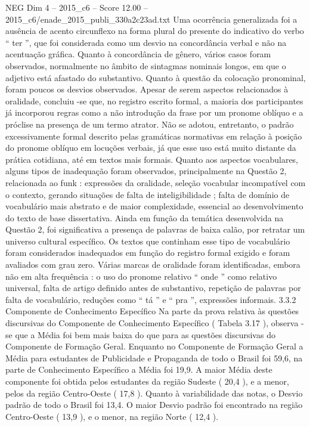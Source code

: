 \begin{textsample}{NEG Dim 4 – 2015\_c6 – Score 12.00 – 2015\_c6/enade\_2015\_publi\_330a2c23ad.txt}
Uma ocorrência generalizada foi a ausência de acento circunflexo na forma plural do presente do indicativo do verbo “ ter ”, que foi considerada como um desvio na concordância verbal e não na acentuação gráfica.
Quanto à concordância de gênero, vários casos foram observados, normalmente no âmbito de sintagmas nominais longos, em que o adjetivo está afastado do substantivo.
Quanto à questão da colocação pronominal, foram poucos os desvios observados.
Apesar de serem aspectos relacionados à oralidade, concluiu -se que, no registro escrito formal, a maioria dos participantes já incorporou regras como a não introdução da frase por um pronome oblíquo e a próclise na presença de um termo atrator.
Não se adotou, entretanto, o padrão excessivamente formal descrito pelas gramáticas normativas em relação à posição do pronome oblíquo em locuções verbais, já que esse uso está muito distante da prática cotidiana, até em textos mais formais.
Quanto aos aspectos vocabulares, alguns tipos de inadequação foram observados, principalmente na Questão 2, relacionada ao funk : expressões da oralidade, seleção vocabular incompatível com o contexto, gerando situações de falta de inteligibilidade ; falta de domínio de vocabulário mais abstrato e de maior complexidade, essencial ao desenvolvimento do texto de base dissertativa.
Ainda em função da temática desenvolvida na Questão 2, foi significativa a presença de palavras de baixa calão, por retratar um universo cultural específico.
Os textos que continham esse tipo de vocabulário foram considerados inadequados em função do registro formal exigido e foram avaliados com grau zero.
Várias marcas de oralidade foram identificadas, embora não em alta frequência : o uso do pronome relativo “ onde ” como relativo universal, falta de artigo definido antes de substantivo, repetição de palavras por falta de vocabulário, reduções como “ tá ” e “ pra ”, expressões informais. 3.3.2 Componente de Conhecimento Específico Na parte da prova relativa às questões discursivas do Componente de Conhecimento Específico ( Tabela 3.17 ), observa -se que a Média foi bem mais baixa do que para as questões discursivas do Componente de Formação Geral.
Enquanto no Componente de Formação Geral a Média para estudantes de Publicidade e Propaganda de todo o Brasil foi 59,6, na parte de Conhecimento Específico a Média foi 19,9.
A maior Média deste componente foi obtida pelos estudantes da região Sudeste ( 20,4 ), e a menor, pelos da região Centro-Oeste ( 17,8 ).
Quanto à variabilidade das notas, o Desvio padrão de todo o Brasil foi 13,4.
O maior Desvio padrão foi encontrado na região Centro-Oeste ( 13,9 ), e o menor, na região Norte ( 12,4 ).

\end{textsample}
